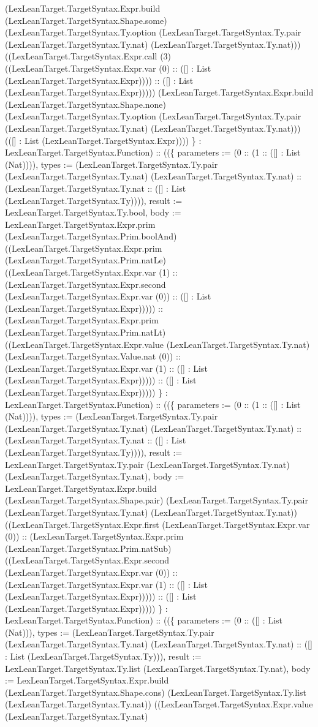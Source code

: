 \documentclass[11pt]{article}
\begin{document}
(LexLeanTarget.TargetSyntax.Expr.build (LexLeanTarget.TargetSyntax.Shape.some) (LexLeanTarget.TargetSyntax.Ty.option (LexLeanTarget.TargetSyntax.Ty.pair (LexLeanTarget.TargetSyntax.Ty.nat) (LexLeanTarget.TargetSyntax.Ty.nat))) ((LexLeanTarget.TargetSyntax.Expr.call (3) ((LexLeanTarget.TargetSyntax.Expr.var (0) :: ([] : List (LexLeanTarget.TargetSyntax.Expr)))) :: ([] : List (LexLeanTarget.TargetSyntax.Expr))))) (LexLeanTarget.TargetSyntax.Expr.build (LexLeanTarget.TargetSyntax.Shape.none) (LexLeanTarget.TargetSyntax.Ty.option (LexLeanTarget.TargetSyntax.Ty.pair (LexLeanTarget.TargetSyntax.Ty.nat) (LexLeanTarget.TargetSyntax.Ty.nat))) (([] : List (LexLeanTarget.TargetSyntax.Expr)))) \} : LexLeanTarget.TargetSyntax.Function) :: ((\{ parameters := (0 :: (1 :: ([] : List (Nat)))), types := (LexLeanTarget.TargetSyntax.Ty.pair (LexLeanTarget.TargetSyntax.Ty.nat) (LexLeanTarget.TargetSyntax.Ty.nat) :: (LexLeanTarget.TargetSyntax.Ty.nat :: ([] : List (LexLeanTarget.TargetSyntax.Ty)))), result := LexLeanTarget.TargetSyntax.Ty.bool, body := LexLeanTarget.TargetSyntax.Expr.prim (LexLeanTarget.TargetSyntax.Prim.boolAnd) ((LexLeanTarget.TargetSyntax.Expr.prim (LexLeanTarget.TargetSyntax.Prim.natLe) ((LexLeanTarget.TargetSyntax.Expr.var (1) :: (LexLeanTarget.TargetSyntax.Expr.second (LexLeanTarget.TargetSyntax.Expr.var (0)) :: ([] : List (LexLeanTarget.TargetSyntax.Expr))))) :: (LexLeanTarget.TargetSyntax.Expr.prim (LexLeanTarget.TargetSyntax.Prim.natLt) ((LexLeanTarget.TargetSyntax.Expr.value (LexLeanTarget.TargetSyntax.Ty.nat) (LexLeanTarget.TargetSyntax.Value.nat (0)) :: (LexLeanTarget.TargetSyntax.Expr.var (1) :: ([] : List (LexLeanTarget.TargetSyntax.Expr))))) :: ([] : List (LexLeanTarget.TargetSyntax.Expr))))) \} : LexLeanTarget.TargetSyntax.Function) :: ((\{ parameters := (0 :: (1 :: ([] : List (Nat)))), types := (LexLeanTarget.TargetSyntax.Ty.pair (LexLeanTarget.TargetSyntax.Ty.nat) (LexLeanTarget.TargetSyntax.Ty.nat) :: (LexLeanTarget.TargetSyntax.Ty.nat :: ([] : List (LexLeanTarget.TargetSyntax.Ty)))), result := LexLeanTarget.TargetSyntax.Ty.pair (LexLeanTarget.TargetSyntax.Ty.nat) (LexLeanTarget.TargetSyntax.Ty.nat), body := LexLeanTarget.TargetSyntax.Expr.build (LexLeanTarget.TargetSyntax.Shape.pair) (LexLeanTarget.TargetSyntax.Ty.pair (LexLeanTarget.TargetSyntax.Ty.nat) (LexLeanTarget.TargetSyntax.Ty.nat)) ((LexLeanTarget.TargetSyntax.Expr.first (LexLeanTarget.TargetSyntax.Expr.var (0)) :: (LexLeanTarget.TargetSyntax.Expr.prim (LexLeanTarget.TargetSyntax.Prim.natSub) ((LexLeanTarget.TargetSyntax.Expr.second (LexLeanTarget.TargetSyntax.Expr.var (0)) :: (LexLeanTarget.TargetSyntax.Expr.var (1) :: ([] : List (LexLeanTarget.TargetSyntax.Expr))))) :: ([] : List (LexLeanTarget.TargetSyntax.Expr))))) \} : LexLeanTarget.TargetSyntax.Function) :: ((\{ parameters := (0 :: ([] : List (Nat))), types := (LexLeanTarget.TargetSyntax.Ty.pair (LexLeanTarget.TargetSyntax.Ty.nat) (LexLeanTarget.TargetSyntax.Ty.nat) :: ([] : List (LexLeanTarget.TargetSyntax.Ty))), result := LexLeanTarget.TargetSyntax.Ty.list (LexLeanTarget.TargetSyntax.Ty.nat), body := LexLeanTarget.TargetSyntax.Expr.build (LexLeanTarget.TargetSyntax.Shape.cons) (LexLeanTarget.TargetSyntax.Ty.list (LexLeanTarget.TargetSyntax.Ty.nat)) ((LexLeanTarget.TargetSyntax.Expr.value (LexLeanTarget.TargetSyntax.Ty.nat) 
\end{document}
